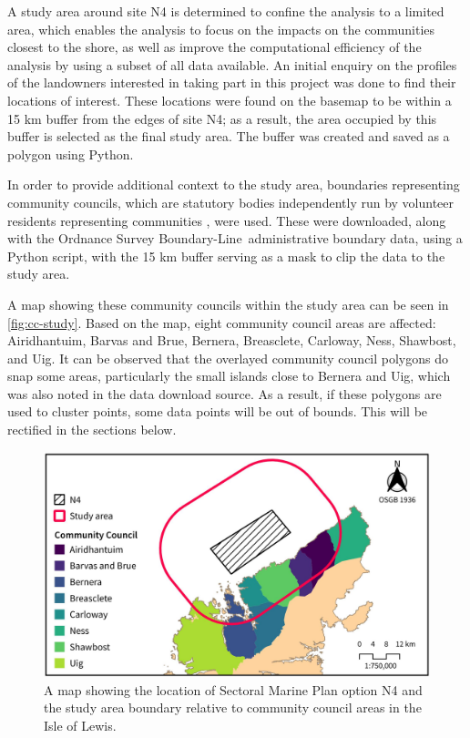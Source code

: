 A study area around site N4 is determined to confine the analysis to a limited area, which enables the analysis to focus on the impacts on the communities closest to the shore, as well as improve the computational efficiency of the analysis by using a subset of all data available. An initial enquiry on the profiles of the landowners interested in taking part in this project was done to find their locations of interest. These locations were found on the basemap to be within a 15 km buffer from the edges of site N4; as a result, the area occupied by this buffer is selected as the final study area. The buffer was created and saved as a polygon using Python.

In order to provide additional context to the study area, boundaries representing community councils, which are statutory bodies independently run by volunteer residents representing communities \autocite{cnes-cc}, were used. These were downloaded, along with the Ordnance Survey Boundary-Line\texttrademark\ administrative boundary data, using a Python script, with the 15 km buffer serving as a mask to clip the data to the study area.

A map showing these community councils within the study area can be seen in \autoref{fig:cc-study}. Based on the map, eight community council areas are affected: Airidhantuim, Barvas and Brue, Bernera, Breasclete, Carloway, Ness, Shawbost, and Uig. It can be observed that the overlayed community council polygons do snap some areas, particularly the small islands close to Bernera and Uig, which was also noted in the data download source. As a result, if these polygons are used to cluster points, some data points will be out of bounds. This will be rectified in the sections below.

\begin{figure}
  \centering
  \includegraphics{images/maps/study_area}
  \caption{A map showing the location of Sectoral Marine Plan option N4 and the study area boundary relative to community council areas in the Isle of Lewis. \label{fig:cc-study}}
\end{figure}

